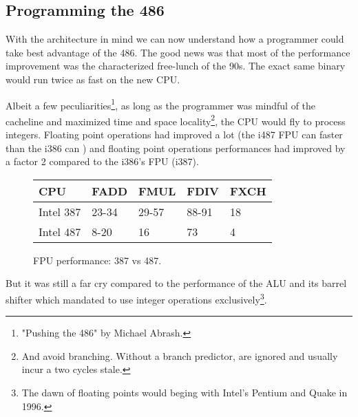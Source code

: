 \subsection{Programming the 486}
With the architecture in mind we can now understand how a programmer could take best advantage of the 486. The good news was that most of the performance improvement was the characterized free-lunch of the 90s. The exact same binary would run twice as fast on the new CPU.\\
\par
Albeit a few peculiarities\footnote{"Pushing the 486" by Michael Abrash.}, as long as the programmer was mindful of the cacheline and maximized time and space locality\footnote{And avoid branching. Without a branch predictor,  are ignored and usually incur a two cycles stale.}, the CPU would fly to process integers. Floating point operations had improved a lot (the i487 FPU can  faster than the i386 can ) and floating point operations performances had improved by a factor 2 compared to the i386's FPU (i387).\\
\par
\begin{figure}[H]
\centering
\begin{tabularx}{\textwidth}{ X  X X  X  X}
  \toprule
  \textbf{CPU} & \textbf{FADD} & \textbf{FMUL} & \textbf{FDIV} &\textbf{FXCH} \\ \bottomrule
Intel 387 & 23-34 & 29-57   & 88-91 & 18 \\
Intel 487 & 8-20  & 16   & 73 & 4 \\ \bottomrule
\end{tabularx}
\caption{FPU performance: 387 vs 487.}

\end{figure}

\par
But it was still a far cry compared to the performance of the ALU and its barrel shifter which mandated \doom{} to use integer operations exclusively\footnote{The dawn of floating points would beging with Intel's Pentium and Quake in 1996.}.\\

